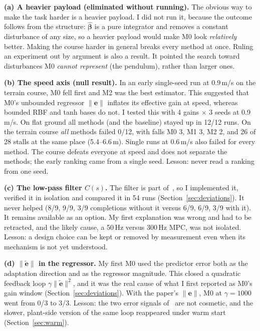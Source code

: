 \documentclass[conference]{IEEEtran}
\newcommand{\etilde}{\tilde{\bm e}}
\begin{document}
\textbf{(a) A heavier payload (eliminated without running).} The obvious
way to make the task harder is a heavier payload. I did not run it,
because the outcome follows from the structure: $\hat{\bm\beta}$ is a
pure integrator and removes a constant disturbance of any size, so a
heavier payload would make M0 look \emph{relatively} better. Making the
course harder in general breaks every method at once. Ruling an
experiment out by argument is also a result. It pointed the search
toward disturbances M0 \emph{cannot represent} (the pendulum), rather
than larger ones.

\textbf{(b) The speed axis (null result).} In an early single-seed run
at 0.9\,m/s on the terrain course, M0 fell first and M2 was the best
estimator. This suggested that M0's unbounded regressor $\|\bm e\|$
inflates its effective gain at speed, whereas bounded RBF and tanh
bases do not. I tested this with 4 gains $\times$ 3 seeds at 0.9\,m/s.
On flat ground all methods (and the baseline) stayed up in 12/12 runs.
On the terrain course \emph{all} methods failed 0/12, with falls M0 3,
M1 3, M2 2, and 26 of 28 stalls at the same place (5.4--6.6\,m).
Single runs at 0.6\,m/s also failed for every method. The course defeats
everyone at speed and does not separate the methods; the early ranking
came from a single seed. Lesson: never read a ranking from one seed.

\textbf{(c) The low-pass filter $C(s)$.} The filter is part
of~\cite{sombolestan2024}, so I implemented it, verified it in isolation
and compared it in 54 runs (Section~\ref{sec:deviations}). It never
helped (8/9, 9/9, 3/9 completions without it versus 6/9, 6/9, 3/9 with
it). It remains available as an option. My first explanation was wrong
and had to be retracted, and the likely cause, a 50\,Hz versus 300\,Hz
MPC, was not isolated. Lesson: a design choice can be kept or removed by
measurement even when its mechanism is not yet understood.

\textbf{(d) $\|\etilde\|$ in the regressor.} My first M0 used the
predictor error both as the adaptation direction and as the regressor
magnitude. This closed a quadratic feedback loop $\gamma\|\etilde\|^2$,
and it was the real cause of what I first reported as M0's gain window
(Section~\ref{sec:deviations}). With the paper's $\|\bm e\|$, M0 at
$\gamma=1000$ went from 0/3 to 3/3. Lesson: the two error signals
of~\cite{sombolestan2024} are not cosmetic, and the slower, plant-side
version of the same loop reappeared under warm start
(Section~\ref{sec:warm}).
\end{document}

